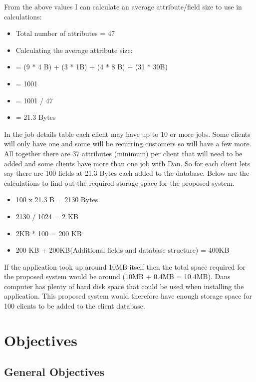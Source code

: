 \begin{flushleft}
From the above values I can calculate an average attribute/field size to use in calculations:

\begin{itemize}
    \item Total number of attributes = 47
		\item Calculating the average attribute size:
\item = (9 * 4 B) + (3 * 1B) + (4 * 8 B) + (31 * 30B)
\item = 1001
\item = 1001 / 47 
\item = 21.3 Bytes

\end{itemize}
In the job details table each client may have up to 10 or more jobs. Some clients will only have one and some will be recurring customers so will have a few more. All together there are 37 attributes (minimum) per client that will need to be added and some clients have more than one job with Dan. So for each client lets say there are 100 fields at 21.3 Bytes each added to the database. Below are the calculations to find out the required storage space for the proposed system.

\begin{itemize}
    \item 100 x 21.3 B = 2130 Bytes
	\item 2130 / 1024 = 2 KB
	\item 2KB * 100 = 200 KB
	\item 200 KB + 200KB(Additional fields and database structure) = 400KB
\end{itemize}


If the application took up around 10MB itself then the total space required for the proposed system would be around (10MB + 0.4MB = 10.4MB). Dans computer has plenty of hard disk space that could be used when installing the application. This proposed system would therefore have enough storage space for 100 clients to be added to the client database.


\end{flushleft}



\section{Objectives}

\subsection{General Objectives}

